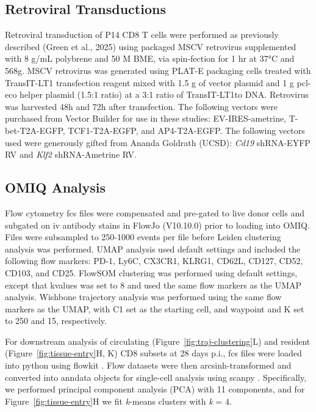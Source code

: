 \subsection{Retroviral Transductions}

Retroviral transduction of P14 CD8 T cells were performed as previously described (Green et al., 2025) using packaged MSCV retrovirus supplemented with 8 \textmu{}g/mL polybrene and 50 \textmu{}M BME, via spin-fection for 1 hr at 37°C and 568g. MSCV retrovirus was generated using PLAT-E packaging cells treated with TransIT-LT1 transfection reagent mixed with 1.5 \textmu{}g of vector plasmid and 1 \textmu{}g pcl-eco helper plasmid (1.5:1 ratio) at a 3:1 ratio of TransIT-LT1to DNA. Retrovirus was harvested 48h and 72h after transfection. The following vectors were purchased from Vector Builder for use in these studies: EV-IRES-ametrine, T-bet-T2A-EGFP, TCF1-T2A-EGFP, and AP4-T2A-EGFP. The following vectors used were generously gifted from Ananda Goldrath (UCSD): \emph{Cd19} shRNA-EYFP RV and \emph{Klf2} shRNA-Ametrine RV.

\subsection{OMIQ Analysis}

Flow cytometry fcs files were compensated and pre-gated to live donor cells and subgated on iv antibody stains in FlowJo (V10.10.0) prior to loading into OMIQ. Files were subsampled to 250-1000 events per file before Leiden clustering analysis was performed. UMAP analysis used default settings and included the following flow markers: PD-1, Ly6C, CX3CR1, KLRG1, CD62L, CD127, CD52, CD103, and CD25. FlowSOM clustering was performed using default settings, except that kvalues was set to 8 and used the same flow markers as the UMAP analysis. Wishbone trajectory analysis was performed using the same flow markers as the UMAP, with C1 set as the starting cell, and waypoint and K set to 250 and 15, respectively.

For downstream analysis of circulating (Figure~\ref{fig:traj-clustering}L) and resident (Figure~\ref{fig:tissue-entry}H, K) CD8 subsets at 28 days p.i., fcs files were loaded into python using flowkit \citep{whiteFlowKitPythonToolkit2021}. Flow datasets were then arcsinh-transformed and converted into anndata objects for single-cell analysis using scanpy \citep{wolfSCANPYLargescaleSinglecell2018}. Specifically, we performed principal component analysis (PCA) with 11 components, and for Figure~\ref{fig:tissue-entry}H we fit \emph{k}-means clusters with \emph{k} = 4.

